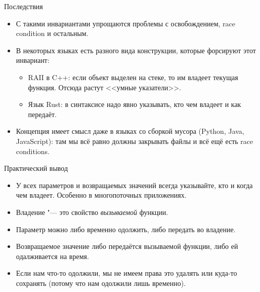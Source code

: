 \begin{frame}[t]{Последствия}
	\begin{itemize}
		\item С такими инвариантами упрощаются проблемы с освобождением, race condition и остальным.
		\item В некоторых языках есть разного вида конструкции, которые форсируют этот инвариант:
			\begin{itemize}
				\item
					RAII в C++: если объект выделен на стеке, то им владеет текущая функция.
					Отсюда растут <<умные указатели>>.
				\item
					Язык Rust: в синтаксисе надо явно указывать, кто чем владеет и как передаёт.
			\end{itemize} 
		\item
			Концепция имеет смысл даже в языках со сборкой мусора (Python, Java, JavaScript):
			там мы всё равно должны закрывать файлы и всё ещё есть race conditions.
	\end{itemize}
\end{frame}


\begin{frame}[t]{Практический вывод}
	\begin{itemize}
		\item
			У всех параметров и возвращаемых значений всегда указывайте, кто и когда чем владеет.
			Особенно в многопоточных приложениях.
		\item Владение "--- это свойство \textit{вызываемой} функции.
		\item Параметр можно либо временно одолжить, либо передать во владение.
		\item Возвращаемое значение либо передаётся вызываемой функции, либо ей одалживается на время.
		\item Если нам что-то одолжили, мы не имеем права это удалять или куда-то сохранять (потому что нам одолжили лишь временно).
	\end{itemize}
\end{frame}
